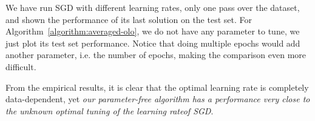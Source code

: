 We have run \ac{SGD} with different learning rates, only one pass over the dataset, and shown the performance of its last solution on the test set. For Algorithm~\ref{algorithm:averaged-olo}, we do not have any parameter to tune, we just plot its test set performance. Notice that doing multiple epochs would add another parameter, i.e. the number of epochs, making the comparison even more difficult.

From the empirical results, it is clear that the optimal learning rate is completely
data-dependent, yet \emph{our parameter-free algorithm has a performance very close
to the unknown optimal tuning of the learning rateof \ac{SGD}}.
